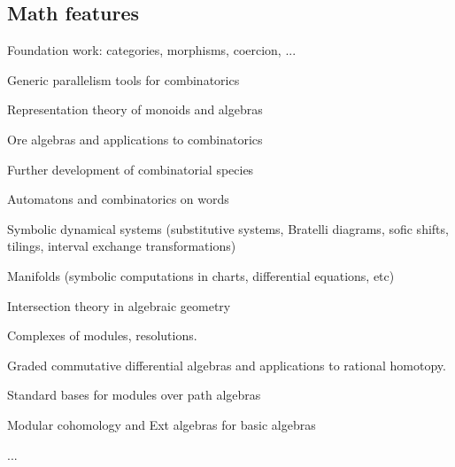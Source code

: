 \subsection{Math features}

\begin{compactitem}
\item Foundation work: categories, morphisms, coercion, ...
\item Generic parallelism tools for combinatorics
\item Representation theory of monoids and algebras
\item Ore algebras and applications to combinatorics
\item Further development of combinatorial species
\item Automatons and combinatorics on words
\item Symbolic dynamical systems (substitutive systems, Bratelli diagrams,
  sofic shifts, tilings, interval exchange transformations)
\item Manifolds (symbolic computations in charts, differential equations, etc)
\item Intersection theory in algebraic geometry
\item Complexes of modules, resolutions.
\item Graded commutative differential algebras and applications to rational homotopy.
\item Standard bases for modules over path algebras
\item Modular cohomology and Ext algebras for basic algebras
\item ...
\end{compactitem}

